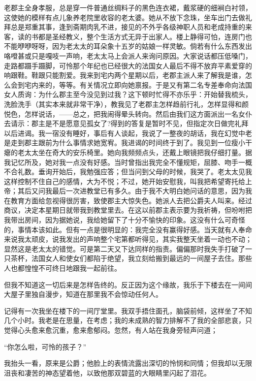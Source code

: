 \documentclass[12pt, UTF8]{ctexbook}
\begin{document}
\par 老郡主全身孝服，总是穿一件普通丝绸料子的黑色连衣裙，戴浆硬的细裥白衬领，这使她的模样有点儿象养老院里收容的老太婆。她从不放下念珠，坐车出门去做礼拜总是郑重其事，逢到斋期肉乳不进，接见的不外乎各级神职人员和老成持重的来客，读的书都是圣经教义，整个生活方式无异于出家人。楼上静得可怕，连房门也不能咿咿呀呀，因为老太太的耳朵象十五岁的姑娘一样灵敏。倘若有什么东西发出咯噔甚或只是嘎吱一声响，老太太马上会派人来询问原因。大家说话都压低嗓门，走路都蹑手蹑脚，可怜那个年纪也已经很大的法国女人最后不得不放弃平素爱穿的响跟鞋。鞋跟只能割爱。我来到宅内两个星期以后，老郡主派人来了解我是谁，怎么会到宅内来的，等等。有关情况立即向她禀报。于是又有第二名专差奉命向法国女人质询：为什么郡主至今没见到过我？这下顿时忙得不亦乐乎：开始替我梳头，洗脸洗手（其实本来就非常干净），教我见了老郡主怎样趋前行礼，怎样显得和颜悦色，怎样说话，——总之，把我闹得晕头转向。然后由我们这方面派出一名女仆去请示：郡主是不是愿意见孤女了?得到的答复是暂时不见，但指定次日做完礼拜以后进谒。我一宿没有睡好，事后有人谈起，我说了一整夜的胡话，我在幻觉中老是走到郡主跟前为什么事情求她宽宥。我进谒的时间终于到了。我见到一位瘦小干瘪的老太太坐在奇大的安乐椅里。她向我频频点头，还戴上眼镜把我仔细打量。据我记忆所及，她对我一点没有好感。当时曾指出我完全不懂规矩，屈膝、吻手一概不合礼数。垂询开始后，我勉强应答；但当问到父母的时候，我哭了。老太太见我这样控制不住自己的感情，大为不悦；不过，她开始安慰我，叫我把希望寄托给上帝；其后又问我最后一次进教堂已有多久。由于我不大明白她问话的意思，因为我在教育方面给忽视得很厉害，致使郡主大惊失色。她派人去把公爵夫人叫来。经过商议，决定本星期日就带我到教堂里去。在这以前郡主表示要为我祈祷，但吩咐把我带出房间，因为据她说，我给她留下了十分不愉快的印象。这没有什么可奇怪的，事情本该如此。但有一点是很明显的：我完全没有赢得好感。当天就有人奉命来说我太顽皮，说我发出的声响整个宅第都听得见，其实我整天坐着一动也不动；显然这是老太太的错觉。可是第二天又下达同样的指责。偏偏那时我失手打破了一只茶杯，法国女人和使女们都陷于绝望，我立刻给搬到最远的一间屋子去住。那些人也都惶惶不可终日地跟我一起前往。
\par 但我不知道这一切后来是怎样告终的。反正因为这个缘故，我乐于下楼去在一间间大屋子里独自漫步，知道在那里我不会惊动任何人。
\par 记得有一次我坐在楼下的一间厅堂里。我双手捂住面孔，脑袋前倾，这样坐了不知几个小时。我老是在思量，在考虑；我的未成熟的智力排解不了我的全部悲哀，只觉得心头愈来愈沉重，愈来愈郁闷。忽然，有人站在我身旁轻声问道；
\par “你怎么啦，可怜的孩子？”
\par 我抬头一看，原来是公爵；他脸上的表情流露出深切的怜悯和同情；但我却以无限沮丧和凄苦的神态望着他，以致他那双碧蓝的大眼睛里闪起了泪花。
\end{document}
